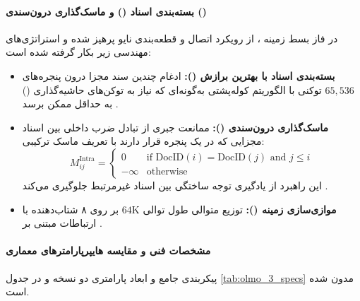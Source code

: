 \paragraph*{بسته‌بندی اسناد () و ماسک‌گذاری درون‌سندی ()}
در فاز بسط زمینه ، از رویکرد اتصال و قطعه‌بندی نایو پرهیز شده و استراتژی‌های مهندسی زیر بکار گرفته شده است:
\begin{itemize}
    \item \textbf{بسته‌بندی اسناد با بهترین برازش ():} ادغام چندین سند مجزا درون پنجره‌های $65{,}536$ توکنی با الگوریتم کوله‌پشتی به‌گونه‌ای که نیاز به توکن‌های حاشیه‌گذاری () به حداقل ممکن برسد \cite{ding2024fewer}.
    \item \textbf{ماسک‌گذاری درون‌سندی ():} ممانعت جبری از تبادل ضرب داخلی بین اسناد مجزایی که در یک پنجره قرار دارند با تعریف ماسک ترکیبی:
    \begin{equation}
        M_{ij}^{\text{Intra}} = \begin{cases} 
            0 & \text{if } \text{DocID}(i) = \text{DocID}(j) \text{ and } j \le i \\ 
            -\infty & \text{otherwise} 
        \end{cases}
    \end{equation}
    این راهبرد از یادگیری توجه ساختگی بین اسناد غیرمرتبط جلوگیری می‌کند \cite{zhao2024sequence}.
    \item \textbf{موازی‌سازی زمینه ():} توزیع متوالی طول توالی $64\text{K}$ بر روی ۸ شتاب‌دهنده  با ارتباطات مبتنی بر  \cite{chu2025scaling}.
\end{itemize}

\paragraph*{مشخصات فنی و مقایسه هایپرپارامترهای معماری}
پیکربندی جامع و ابعاد پارامتری دو نسخه  و  در جدول \ref{tab:olmo_3_specs} مدون شده است.

